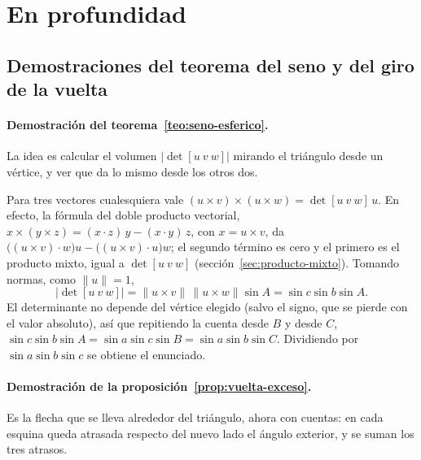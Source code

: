 \section{En profundidad}

\subsection{Demostraciones del teorema del seno y del giro de la vuelta}\label{sec:esfera-demostraciones}

\paragraph{Demostración del teorema~\ref{teo:seno-esferico}.} La idea es calcular el volumen
\(|\det[u\ v\ w]|\) mirando el triángulo desde un vértice, y ver que da lo mismo desde los
otros dos.

\begin{demostracion}
Para tres vectores cualesquiera vale \((u\times v)\times(u\times w)=\det[u\ v\ w]\,u\). En
efecto, la fórmula del doble producto vectorial,
\(x\times(y\times z)=(x\cdot z)\,y-(x\cdot y)\,z\), con \(x=u\times v\), da
\(\bigl((u\times v)\cdot w\bigr)u-\bigl((u\times v)\cdot u\bigr)w\); el segundo término es
cero y el primero es el producto mixto, igual a \(\det[u\ v\ w]\)
(sección~\ref{sec:producto-mixto}). Tomando normas, como \(\|u\|=1\),
\[
  |\det[u\ v\ w]|=\|u\times v\|\,\|u\times w\|\sin A=\sin c\sin b\sin A .
\]
El determinante no depende del vértice elegido (salvo el signo, que se pierde con el valor
absoluto), así que repitiendo la cuenta desde \(B\) y desde \(C\),
\(\sin c\sin b\sin A=\sin a\sin c\sin B=\sin a\sin b\sin C\). Dividiendo por
\(\sin a\sin b\sin c\) se obtiene el enunciado.
\end{demostracion}

\paragraph{Demostración de la proposición~\ref{prop:vuelta-exceso}.} Es la flecha que se lleva
alrededor del triángulo, ahora con cuentas: en cada esquina queda atrasada respecto del nuevo
lado el ángulo exterior, y se suman los tres atrasos.

